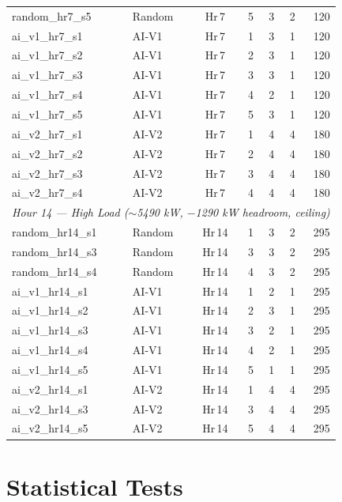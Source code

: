 \begin{table}[t]
\begin{tabular}{llcrrrr}
random\_hr7\_s5  & Random & Hr\,7 & 5 & 3 & 2 & 120 \\
ai\_v1\_hr7\_s1  & AI-V1  & Hr\,7 & 1 & 3 & 1 & 120 \\
ai\_v1\_hr7\_s2  & AI-V1  & Hr\,7 & 2 & 3 & 1 & 120 \\
ai\_v1\_hr7\_s3  & AI-V1  & Hr\,7 & 3 & 3 & 1 & 120 \\
ai\_v1\_hr7\_s4  & AI-V1  & Hr\,7 & 4 & 2 & 1 & 120 \\
ai\_v1\_hr7\_s5  & AI-V1  & Hr\,7 & 5 & 3 & 1 & 120 \\
ai\_v2\_hr7\_s1  & AI-V2  & Hr\,7 & 1 & 4 & 4 & 180 \\
ai\_v2\_hr7\_s2  & AI-V2  & Hr\,7 & 2 & 4 & 4 & 180 \\
ai\_v2\_hr7\_s3  & AI-V2  & Hr\,7 & 3 & 4 & 4 & 180 \\
ai\_v2\_hr7\_s4  & AI-V2  & Hr\,7 & 4 & 4 & 4 & 180 \\
\midrule
\multicolumn{7}{l}{\textit{Hour 14 --- High Load ($\sim$5490 kW, $-$1290 kW headroom, ceiling)}} \\
\midrule
random\_hr14\_s1 & Random & Hr\,14 & 1 & 3 & 2 & 295 \\
random\_hr14\_s3 & Random & Hr\,14 & 3 & 3 & 2 & 295 \\
random\_hr14\_s4 & Random & Hr\,14 & 4 & 3 & 2 & 295 \\
ai\_v1\_hr14\_s1 & AI-V1  & Hr\,14 & 1 & 2 & 1 & 295 \\
ai\_v1\_hr14\_s2 & AI-V1  & Hr\,14 & 2 & 3 & 1 & 295 \\
ai\_v1\_hr14\_s3 & AI-V1  & Hr\,14 & 3 & 2 & 1 & 295 \\
ai\_v1\_hr14\_s4 & AI-V1  & Hr\,14 & 4 & 2 & 1 & 295 \\
ai\_v1\_hr14\_s5 & AI-V1  & Hr\,14 & 5 & 1 & 1 & 295 \\
ai\_v2\_hr14\_s1 & AI-V2  & Hr\,14 & 1 & 4 & 4 & 295 \\
ai\_v2\_hr14\_s3 & AI-V2  & Hr\,14 & 3 & 4 & 4 & 295 \\
ai\_v2\_hr14\_s5 & AI-V2  & Hr\,14 & 5 & 4 & 4 & 295 \\
\bottomrule
\end{tabular}
\end{table}

\section{Statistical Tests}
\label{app:stats}

